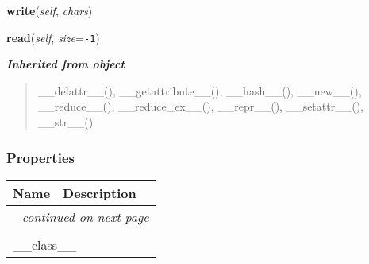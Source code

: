 \hspace{.8\funcindent}\begin{boxedminipage}{\funcwidth}

    \raggedright \textbf{write}(\textit{self}, \textit{chars})

\setlength{\parskip}{2ex}
\setlength{\parskip}{1ex}
    \end{boxedminipage}

    \label{cssutils:tests:test_codec:Queue:read}

    \vspace{0.5ex}

\hspace{.8\funcindent}\begin{boxedminipage}{\funcwidth}

    \raggedright \textbf{read}(\textit{self}, \textit{size}={\tt -1})

\setlength{\parskip}{2ex}
\setlength{\parskip}{1ex}
    \end{boxedminipage}


\large{\textbf{\textit{Inherited from object}}}

\begin{quote}
\_\_delattr\_\_(), \_\_getattribute\_\_(), \_\_hash\_\_(), \_\_new\_\_(), \_\_reduce\_\_(), \_\_reduce\_ex\_\_(), \_\_repr\_\_(), \_\_setattr\_\_(), \_\_str\_\_()
\end{quote}


  \subsubsection{Properties}

    \vspace{-1cm}
\hspace{\varindent}\begin{longtable}{|p{\varnamewidth}|p{\vardescrwidth}|l}
\cline{1-2}
\cline{1-2} \centering \textbf{Name} & \centering \textbf{Description}& \\
\cline{1-2}
\endhead\cline{1-2}\multicolumn{3}{r}{\small\textit{continued on next page}}\\\endfoot\cline{1-2}
\endlastfoot\multicolumn{2}{|l|}{\textit{Inherited from object}}\\
\multicolumn{2}{|p{\varwidth}|}{\raggedright \_\_class\_\_}\\
\cline{1-2}
\end{longtable}


